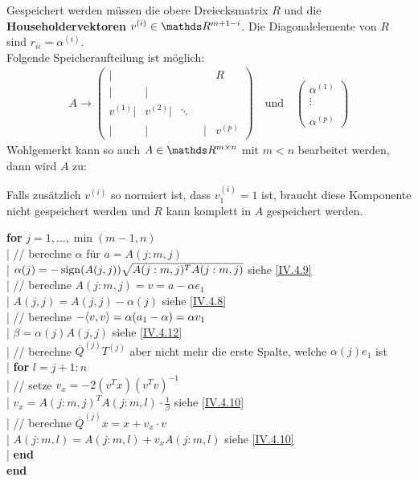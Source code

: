 Gespeichert werden müssen die obere Dreiecksmatrix $R$ und die 
\textbf{Householdervektoren} 
$v^{(i)}\in \R^{m+1-i}$.
Die Diagonalelemente von $R$ sind $r_{ii} = \alpha^{(i)}$. \\
Folgende Speicheraufteilung ist möglich:
\begin{gather*}
  A \longrightarrow \left(
    \begin{array}{rrrrr}
      |&&& R \\
      |&| \\
      v^{(1)}| & v^{(2)}|&\ddots ~~\\
      | &|&\phantom{v^{(i)}}|& v^{(p)}			
    \end{array}
  \right)
  \quad \text{und} \quad 
  \begin{pmatrix}
    \alpha^{(1)} \\ \vdots \\ \\ \alpha^{(p)}
  \end{pmatrix}
\end{gather*}
Wohlgemerkt kann so auch $A\in \R^{m\times n}$ mit $m<n$ bearbeitet werden,
dann wird $A$ zu:

\label{im4.4.5}

Falls zusätzlich $v^{(i)}$ so normiert ist,
dass $v_1^{(i)} = 1$ ist, braucht diese Komponente nicht gespeichert werden 
und $R$ kann komplett in $A$ gespeichert werden.


\begin{pseudocode}{\linewidth}
  \textbf{for} $j = 1,\dotsc, \min(m - 1, n)$ \\
  |	\>	// berechne $\alpha$ für $a = A(j : m, j)$ \\
  |	\>	$\alpha(j) = -\operatorname{sign}(A(j, j))\sqrt{A(j:m, j)^T A(j:m, j)}$ \>\>\>\> siehe \eqref{IV.4.9}\\
  |	\>  // berechne $A(j:m,j)=v=a-\alpha e_1$ \\
  |	\>	$A(j,j)=A(j,j)-\alpha(j)$ \>\>\>\> siehe \eqref{IV.4.8}\\
  |	\> // berechne $-\langle v, v \rangle = \alpha(a_1 - \alpha) = \alpha v_1$ \\
  |	\> $\beta = \alpha(j)A(j, j)$\>\>\>\> siehe \eqref{IV.4.12}\\
  |	\> // berechne $\overline{Q}^{(j)}T^{(j)}$ 
  aber nicht mehr die erste Spalte, welche $\alpha(j)e_1$ ist\\
  |	\> \textbf{for} $l = j + 1 : n$\\
  |		\>\> // setze $v_x = -2{(v^Tx)}{(v^Tv)}^{-1}$\\
  |		\>\> $v_x = A(j : m, j)^TA(j:m,l)\cdot \frac{1}{\beta}$ \>\>\>siehe \eqref{IV.4.10}\\
  |		\>\> // berechne  $\overline{Q}^{(j)}x=x+v_x\cdot v$\\
  |		\>\> $A(j:m,l) = A(j:m,l)+v_xA(j:m,l)$ \>\>\> siehe \eqref{IV.4.10}\\
  |	\>\textbf{end}\\
  \textbf{end}
\end{pseudocode}


